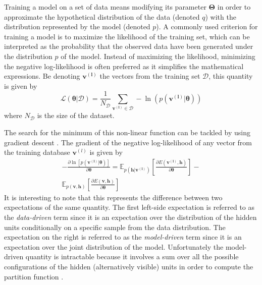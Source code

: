 \documentclass[letterpaper]{article}
\begin{document}
Training a model on a set of data means modifying its parameter $\bm{\Theta}$ in order to approximate the hypothetical distribution of the data (denoted $q$) with the distribution represented by the model (denoted $p$).
A commonly used criterion for training a model is to maximize the likelihood of the training set, which can be interpreted as the probability that the observed data have been generated under the distribution $p$ of the model.
Instead of maximizing the likelihood, minimizing the negative log-likelihood is often preferred as it simplifies the mathematical expressions. Be denoting $\bm{v^{(l)}}$ the vectors from the training set $\mathcal{D}$, this quantity is given by
\begin{equation}
\label{eq:likelihood}
\mathcal{L(\bm{\theta}|\mathcal{D})}  = \frac{1}{N_{\mathcal{D}}} \sum_{\bm{v^{(l)}} \in \mathcal{D}} - \ln \left( p(\bm{v^{(l)}}|\bm{\theta})\right)
\end{equation}
where $N_{\mathcal{D}}$ is the size of the dataset. 

The search for the minimum of this non-linear function can be tackled by using gradient descent \cite{bottou2010large}. The gradient of the negative log-likelihood of any vector from the training database $\bm{v}^{(l)}$ is given by
\begin{equation}
\label{eq:loglik}
\begin{split}
- \frac{\partial \ln \left[ p(\bm{v^{(l)}}|\bm{\theta})\right]}{\partial \bm{\theta}} 
= 
\mathbb{E}_{p(\bm{h}|\bm{v^{(l)}})} \left[ \frac{\partial E(\bm{v^{(l)}},\bm{h})}{\partial \bm{\theta}} \right] 
- \\
\mathbb{E}_{p(\bm{v} , \bm{h})} \left[ \frac{\partial E(\bm{v},\bm{h})}{\partial \bm{\theta}} \right]
\end{split}
\end{equation}
It is interesting to note that this represents the difference between two expectations of the same quantity. The first left-side expectation is referred to as the \textit{data-driven} term since it is an expectation over the distribution of the hidden units conditionally on a specific sample from the data distribution. The expectation on the right is referred to as the \textit{model-driven} term since it is an expectation over the joint distribution of the model.
Unfortunately the model-driven quantity is intractable because it involves a sum over all the possible configurations of the hidden (alternatively visible) units in order to compute the partition function \cite{Fischer2012}.
\end{document}
